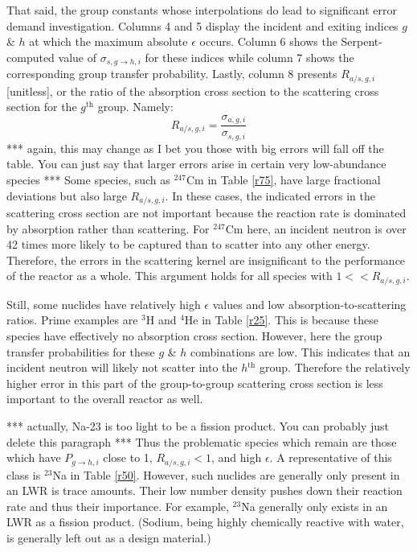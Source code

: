 \documentclass{physor2012}
\newcommand{\superscript}[1]{\ensuremath{^{\textrm{#1}}}}
\newcommand{\nuc}[2]{\superscript{#2}{#1}}
\begin{document}
That said, the group constants whose interpolations do lead to significant error
demand investigation.  Columns 4 and 5 display the incident and exiting indices
$g$ \& $h$ at which the maximum absolute $\epsilon$ occurs.  Column 6 shows
the Serpent-computed value of $\sigma_{s,g\to h,i}$ for these indices while column 7
shows the corresponding group transfer probability.  Lastly, column 8 presents
$R_{a/s,g,i}$ [unitless], or the ratio of the absorption cross section to the
scattering cross section for the $g$\superscript{th} group.  Namely:
\begin{equation}
\label{R_as}
R_{a/s,g,i} = \frac{\sigma_{a,g,i}}{\sigma_{s,g,i}}
\end{equation}
*** again, this may change as I bet you those with big errors will fall off the table.  You can just say that larger errors arise in certain very low-abundance species ***
Some species, such as \nuc{Cm}{247} in Table \ref{r75}, have large fractional deviations
but also large $R_{a/s,g,i}$.  In these cases, the indicated errors in the
scattering cross section are not important because the reaction rate is dominated
by absorption rather than scattering.  For \nuc{Cm}{247} here, an incident neutron is
over 42 times more likely to be captured than to scatter into any other energy.
Therefore, the errors in the scattering kernel are insignificant to the performance
of the reactor as a whole.  This argument holds for all species with $1 << R_{a/s,g,i}$.

Still, some nuclides have relatively high $\epsilon$ values and
low absorption-to-scattering ratios.  Prime examples are \nuc{H}{3} and \nuc{He}{4}
in Table \ref{r25}.  This is because these species have effectively no
absorption cross section.  However, here the group transfer probabilities
for these $g$ \& $h$ combinations are low.  This indicates that an incident
neutron will likely not scatter into the $h$\superscript{th} group.  Therefore the
relatively higher error in this part of the group-to-group scattering cross section
is less important to the overall reactor as well.

*** actually, Na-23 is too light to be a fission product.  You can probably just delete this paragraph ***
Thus the problematic species which remain are those which have $P_{g\to h,i}$ close
to 1, $R_{a/s,g,i} < 1$, and high $\epsilon$.  A representative of this class is
\nuc{Na}{23} in Table \ref{r50}.  However, such nuclides are generally only present
in an LWR is trace amounts.  Their low number density pushes down their reaction rate
and thus their importance.  For example, \nuc{Na}{23} generally only exists in an
LWR as a fission product.  (Sodium, being highly chemically reactive with water, is
generally left out as a design material.)
\end{document}
